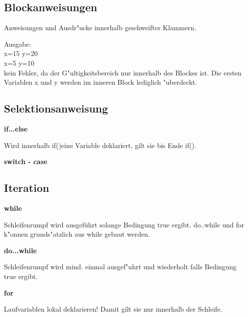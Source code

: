     \subsection{Blockanweisungen}
    Anweisungen und Ausdr"ucke innerhalb geschweifter Klammern. \\
    \begin{minipage}[t]{10 cm}
        
        \end{minipage}	
       	\hspace*{0.5cm}
        \begin{minipage}[c]{5 cm}
        
    	  Ausgabe: \\x=15  y=20 \\ x=5  y=10 \\ kein Fehler, da der G"ultigkeitsbereich nur innerhalb des Blockes ist. Die ersten Variablen x und y werden im inneren Block lediglich "uberdeckt.
        \end{minipage}
     \subsection{Selektionsanweisung}  
     			\begin{minipage}[t]{8.5 cm}
     				\textbf{if...else}
     				
     				Wird innerhalb if()eine Variable deklariert, gilt sie bis Ende if().

     			\end{minipage}
     			\hspace*{0.5cm}
     			\begin{minipage}[t]{8.5 cm}
     				\textbf{switch - case}
     			  	
     			\end{minipage}
     \subsection{Iteration}
          			\begin{minipage}[t]{6 cm}
          				\textbf{while}
          				
          				Schleifenrumpf wird ausgeführt solange Bedingung true ergibt. do..while und for k"onnen grunds"atzlich aus while gebaut werden.
     
          			\end{minipage}
          			\hspace*{0.5cm}
          			\begin{minipage}[t]{6 cm}
          				\textbf{do...while}
          			  	
          			  	Schleifenrumpf wird mind. einmal ausgef"uhrt und wiederholt falls Bedingung true ergibt.
          			\end{minipage}
          			\begin{minipage}[t]{6 cm}
          				\textbf{for}
          			  	
          			  	Laufvariablen lokal deklarieren! Damit gilt sie nur innerhalb der Schleife.
          			\end{minipage}          
